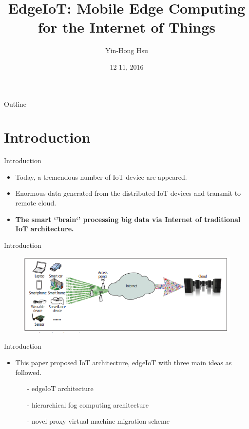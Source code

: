 \documentclass{beamer}
\title {
    EdgeIoT: Mobile Edge Computing for the Internet of Things\cite{7786106}
}
\author {
    Yin-Hong Hsu
}
\date {
    12 11, 2016
}
\begin{document}
\begin{frame}
    \titlepage
\end{frame}


\begin{frame}{Outline}
    \tableofcontentsgather
    \tableofcontents
\end{frame}

\section{Introduction}
\begin{frame} {Introduction} 
    \begin{itemize}
        \item {Today, a tremendous number of IoT device are appeared.}
        \item {Enormous data generated from the distributed IoT devices and transmit to remote cloud.}
        \item \textbf{The smart `'brain`' processing big data via Internet of traditional IoT architecture.} 
    \end{itemize}
\end{frame}

\begin{frame}{Introduction}
    \begin{figure}[t]
        \centering
        \includegraphics[width=1.1\textwidth]{figures/1.png}
        
    \end{figure}
\end{frame}

\begin{frame} {Introduction} 
    \begin{itemize}
        \item {This paper proposed IoT architecture, edgeIoT with three main ideas as followed.}
        \begin{itemize}
        \item [-]{edgeIoT architecture}
        \item [-]{hierarchical fog computing architecture}
        \item [-]{novel proxy virtual machine migration scheme}
        \end{itemize} 
    \end{itemize}
\end{frame}
\end{document}
